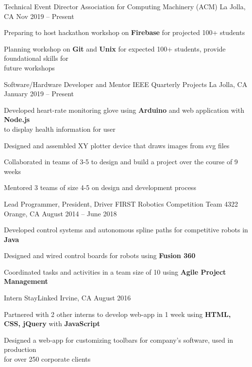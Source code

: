 \documentclass[]{awesome-cv}
\begin{document}
\vspace{-5mm}
\begin{cventries}
	\cventry
  {Technical Event Director}
  {Association for Computing Machinery (ACM)}
	{La Jolla, CA}
  {Nov 2019 – Present}
	{\begin{cvitems}
    \item {Preparing to host hackathon workshop on \textbf{Firebase} for
      projected 100+ students}
    \item {Planning workshop on \textbf{Git} and \textbf{Unix} for expected 100+
      students, provide foundational skills for \\ future workshops}
		\end{cvitems}}

	\vspace{-3mm}
	\cventry
  {Software/Hardware Developer and  Mentor}
	{IEEE Quarterly Projects}
	{La Jolla, CA}
  {January 2019 – Present}
	{\begin{cvitems}
    \item {Developed heart-rate monitoring glove using \textbf{Arduino} and
      web application with \textbf{Node.js}\\ to display health information for
      user}
    \item {Designed and assembled XY plotter device that draws images from svg
      files}
    \item {Collaborated in teams of 3-5 to design and build a project over the
      course of 9 weeks}
    \item {Mentored 3 teams of size 4-5 on design and development process}
		\end{cvitems}}

	\vspace{-3mm}
	\cventry
	{Lead Programmer, President, Driver}
	{FIRST Robotics Competition Team 4322}
	{Orange, CA}
	{August 2014 – June 2018}
	{\begin{cvitems}
		\item {Developed control systems and autonomous spline paths for competitive robots in
      \textbf{Java}}
    \item {Designed and wired control boards for robots using
      \textbf{Fusion 360}}
    \item {Coordinated tasks and activities in a team size of 10 using \textbf{Agile
      Project Management}}
		\end{cvitems}}

	\vspace{-3mm}
	\cventry
	{Intern}
	{StayLinked}
	{Irvine, CA}
	{August 2016}
	{\begin{cvitems}
    \item {Partnered with 2 other interns to develop web-app in 1 week using
      \textbf{HTML, CSS, jQuery} with \textbf{JavaScript}}
		\item {Designed a web-app for customizing toolbars for company’s software,
      used in production\\ for over 250 corporate clients}
		\end{cvitems}}

\end{cventries}
\end{document}

